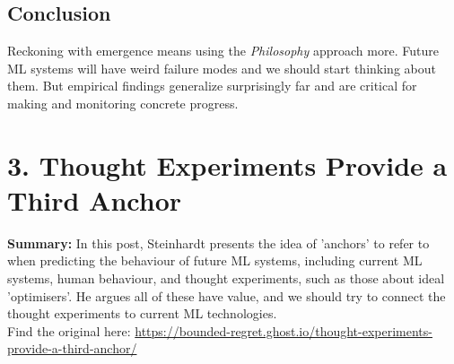 \documentclass{article}
\begin{document}
\begin{multicols}{2}
\subsection*{Conclusion}
Reckoning with emergence means using the \emph{Philosophy} approach more. Future ML systems will have weird failure modes and we should start thinking about them. But empirical findings generalize surprisingly far and are critical for making and monitoring concrete progress.

\section*{3. Thought Experiments Provide a Third Anchor}
\textbf{Summary:} In this post, Steinhardt presents the idea of 'anchors' to refer to when predicting the behaviour of future ML systems, including current ML systems, human behaviour, and thought experiments, such as those about ideal 'optimisers'. He argues all of these have value, and we should try to connect the thought experiments to current ML technologies. \\ Find the original here: \url{https://bounded-regret.ghost.io/thought-experiments-provide-a-third-anchor/}


\end{multicols}
\end{document}
